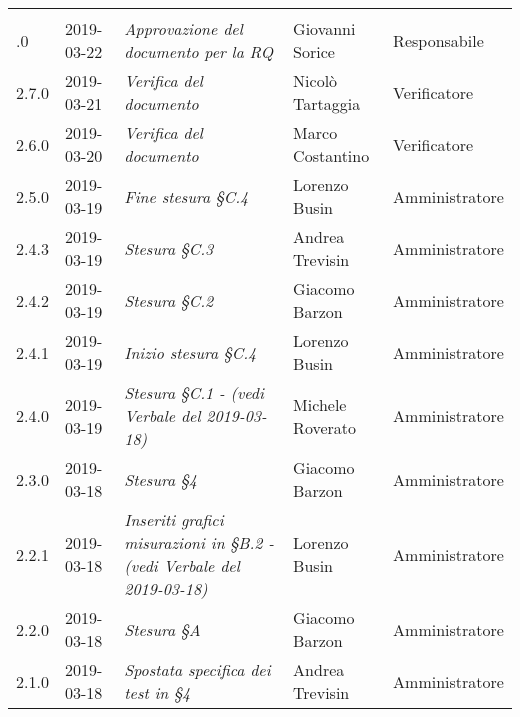 \newpage 
\section*{}
	\begin{longtable}{C{2cm}|C{2.5cm}|C{4.5cm}|C{2.5cm}|C{3cm}}

	 &  &  &  &   \\
	.0 & 2019-03-22 & \emph{Approvazione del documento per la RQ} & Giovanni Sorice & Responsabile \\
		\hline
		
		2.7.0 & 2019-03-21 & \emph{Verifica del documento} & Nicolò Tartaggia & Verificatore \\
		\hline
		
		2.6.0 & 2019-03-20 & \emph{Verifica del documento} & Marco Costantino & Verificatore \\
		\hline
		
		2.5.0 & 2019-03-19 & \emph{Fine stesura §C.4} & Lorenzo Busin & Amministratore \\
		\hline
		
		2.4.3 & 2019-03-19 & \emph{Stesura §C.3} & Andrea Trevisin & Amministratore \\
		\hline
		
		2.4.2 & 2019-03-19 & \emph{Stesura §C.2} & Giacomo Barzon & Amministratore \\
		\hline
		
		2.4.1 & 2019-03-19 & \emph{Inizio stesura §C.4} & Lorenzo Busin & Amministratore \\
		\hline
		
		2.4.0 & 2019-03-19 & \emph{Stesura §C.1 - (vedi Verbale del 2019-03-18)} & Michele Roverato & Amministratore \\
		\hline
		
		2.3.0 & 2019-03-18 & \emph{Stesura §4} & Giacomo Barzon & Amministratore \\
		\hline
	
		2.2.1 & 2019-03-18 & \emph{Inseriti grafici misurazioni in §B.2 - (vedi Verbale del 2019-03-18)} & Lorenzo Busin & Amministratore \\
		\hline
		
		2.2.0 & 2019-03-18 & \emph{Stesura §A} & Giacomo Barzon & Amministratore \\
		\hline
	
		2.1.0 & 2019-03-18 & \emph{Spostata specifica dei test in §4} & Andrea Trevisin  & Amministratore \\
		\hline
	

\end{longtable}
